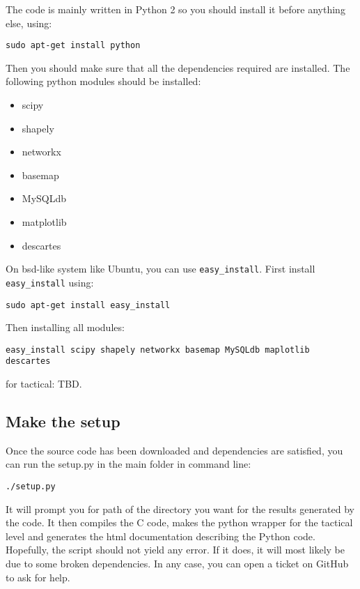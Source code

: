 \documentclass[12pt]{article}
\begin{document}
The code is mainly written in Python 2 so you should install it before anything else, using:

\begin{verbatim}
sudo apt-get install python
\end{verbatim}

Then you should make sure that all the dependencies required are installed. The following python modules should be installed:

\begin{itemize}
\item scipy
\item shapely
\item networkx
\item basemap
\item MySQLdb
\item matplotlib
\item descartes
\end{itemize}

On bsd-like system like Ubuntu, you can use \verb|easy_install|. First install \verb|easy_install| using:

\begin{verbatim}
sudo apt-get install easy_install 
\end{verbatim}

Then installing all modules:

\begin{verbatim}
easy_install scipy shapely networkx basemap MySQLdb maplotlib descartes
\end{verbatim}

for tactical: TBD.

\subsection{Make the setup}

Once the source code has been downloaded and dependencies are satisfied, you can run the setup.py in the main folder in command line:

\begin{verbatim}
./setup.py
\end{verbatim}

It will prompt you for path of the directory you want for the results generated by the code. It then compiles the C code, makes the python wrapper for the tactical level and generates the html documentation describing the Python code. Hopefully, the script should not yield any error. If it does, it will most likely be due to some broken dependencies. In any case, you can open a ticket on GitHub to ask for help. 
\end{document}
